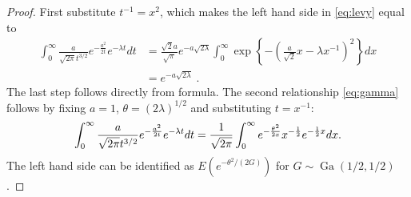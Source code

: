 \documentclass[lineno]{biometrika}
\begin{document}
\begin{proof}
First substitute $t^{-1} = x^2$, which makes the left hand side in
\eqref{eq:levy} equal to 
\begin{align*}
  \int_{0}^{\infty} \frac{a}{\sqrt{2 \pi} t^{3/2}} e^{-\frac{a^2}{2 t}} e^{-\lambda t} dt 
  & = \frac{\sqrt{2} a}{\sqrt{\pi}} e^{-a \sqrt{2 \lambda}} 
  \int_0^{\infty} \exp\left\{-\left(\frac{a}{\sqrt{2}} x - \lambda x^{-1}\right)^2\right\} dx 
  \\
  &= e^{-a \sqrt{2 \lambda}}
  \;.
\end{align*}
The last step follows directly from \CS{} formula.  The second relationship
\eqref{eq:gamma} follows by fixing $a = 1$, $\theta = (2\lambda)^{1/2}$ and
substituting $t = x^{-1}$: 
$$
\int_{0}^{\infty} \frac{a}{\sqrt{2 \pi} t^{3/2}} 
e^{-\frac{a^2}{2 t}} e^{-\lambda t} dt 
= \frac{1}{\sqrt{2 \pi}} \int_{0}^{\infty} e^{-\frac{\theta^2}{2x}} 
x^{-\frac{1}{2}} e^{-\frac{1}{2} x} dx.
$$
The left hand side can be identified as 
$E\left(e^{-\theta^2 / (2 G) } \right)$ for 
$G \sim \operatorname{Ga}(1/2, 1/2)$. %
\end{proof}

\end{document}
